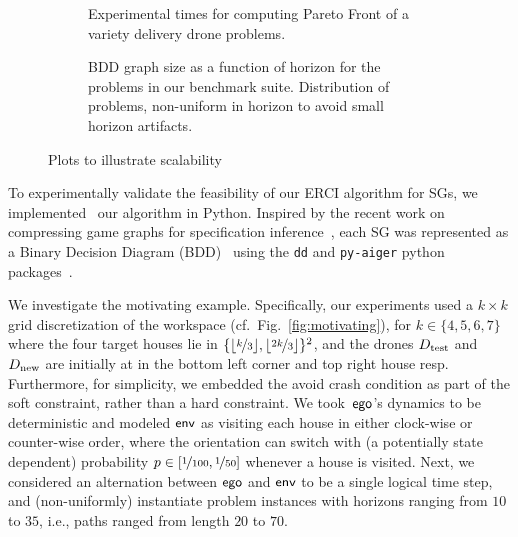 \begin{figure*}
    \begin{subfigure}{0.47\textwidth}
  \centering
  \scalebox{0.50}{
    
    }
    \caption{
      Experimental times for computing Pareto Front of a variety
      delivery drone problems\label{fig:exp_times}.
    }
  \end{subfigure}
  \hfill
    \begin{subfigure}{0.47\textwidth}
    \centering \scalebox{0.53}{
      
    }
    \caption{
      BDD graph size as a function of horizon for the problems in our
      benchmark suite. Distribution of problems, non-uniform in horizon
      to avoid small horizon artifacts\label{fig:bdd_sizes}.
    }
  \end{subfigure}
  \caption{Plots to illustrate scalability} 
\end{figure*}

 To experimentally validate the feasibility of our ERCI
algorithm for SGs, we implemented~\cite{RSS21code} our algorithm in
Python.  Inspired by the recent work on compressing
game graphs for specification
inference~\cite{DBLP:conf/cav/Vazquez-Chanlatte20}, each SG was
represented as a Binary Decision Diagram
(BDD)~\cite{DBLP:journals/csur/Bryant92} using the \texttt{dd} and
\texttt{py-aiger} python packages~\cite{dd, pyAiger}.

We investigate the motivating example.
Specifically, our experiments used
a $k\times k$ grid discretization of the workspace (cf.\ Fig.~\ref{fig:motivating}), for $k \in
\{4,5,6,7\}$ where the four target houses lie in
$\{\lfloor\nicefrac{k}{3}\rfloor, \lfloor\nicefrac{2k}{3}\rfloor
\}^2$, and the drones ${D_{\text{test}}}$ and ${D_{\text{new}}}$ are initially at in the bottom left corner and top right house resp. Furthermore, for simplicity, we embedded the avoid crash
condition as part of the soft constraint, rather than a hard
constraint\footnotemark. We took~$\mathsf{ego}$'s dynamics to be deterministic
and modeled $\mathsf{env}$ as visiting each house in either clock-wise or
counter-wise order, where the orientation can switch with
(a potentially state dependent) probability $p \in [\nicefrac{1}{100},
\nicefrac{1}{50}]$ whenever a house is visited. Next, we considered an
alternation between $\mathsf{ego}$ and $\mathsf{env}$ to be a single logical time
step, and (non-uniformly) instantiate problem instances with horizons
ranging from $10$ to $35$, i.e., paths ranged from length $20$ to
$70$.



